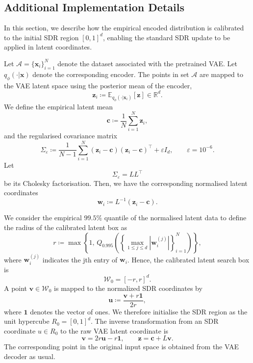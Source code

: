 \documentclass[pdflatex,sn-mathphys-num]{sn-jnl}%
\theoremstyle{thmstyleone}%
\theoremstyle{thmstyletwo}%
\theoremstyle{thmstylethree}%
\begin{document}
\begin{appendices}
\section{Additional Implementation Details}\label{Appendix: Additional Implementation Details}

In this section, we describe how the empirical encoded distribution is calibrated to the initial SDR region $[0, 1]^d$, enabling the standard SDR update to be applied in latent coordinates. 

Let $\mathcal{A}  =\{\mathbf{x}_i\}_{i=1}^{N}$ denote the dataset associated with the pretrained VAE. Let $q_\phi(\cdot|\mathbf{x})$ denote the corresponding encoder. The points in set $\mathcal{A}$ are mapped to the VAE latent space using the posterior mean of the encoder,
\[
\mathbf{z}_i
    \coloneq \mathbb E_{q_{\phi}(\cdot|\mathbf{x}_i)}[\mathbf{z}]
   \in\mathbb{R}^{d}.
\]
We define the empirical latent mean
\[
\mathbf{c}
   \coloneq \frac{1}{N}
    \sum_{i=1}^{N}\mathbf{z}_i,
\]
and the regularised covariance matrix
\[
\Sigma_{\varepsilon}
   \coloneq \frac{1}{N-1}
    \sum_{i=1}^{N}
    (\mathbf{z}_i-\mathbf{c})
    (\mathbf{z}_i-\mathbf{c})^{\top}
    +\varepsilon I_d,
    \qquad \varepsilon=10^{-6}.
\]
Let
\[
\Sigma_{\varepsilon}=LL^{\top}
\]
be its Cholesky factorisation. Then, we have the corresponding normalised latent coordinates
\[
\mathbf{w}_i
    \coloneq L^{-1}(\mathbf{z}_i-\mathbf{c}).
\]

We consider the empirical $99.5\%$ quantile of the normalised latent data to define the radius of the calibrated latent box as
\[
r
   \coloneq \max\left\{
      1,\,
      Q_{0.995}
      \left(
        \left\{
          \max_{1\leq j\leq d}
          |\mathbf{w}_{i}^{(j)}|
        \right\}_{i=1}^{N}
      \right)
    \right\},
\]
where $\mathbf{w}_{i}^{(j)}$ indicates the jth entry of $\mathbf{w}_i$. Hence, the calibrated latent search box is
\[
\mathcal{W}_0=[-r,r]^d.
\]
A point \(\mathbf{v}\in\mathcal{W}_0\) is mapped to the normalized SDR coordinates by
\[
\mathbf{u}
   \coloneq \frac{\mathbf{v}+r\mathbf{1}}{2r},
\]
where $\mathbf{1}$ denotes the vector of ones. We therefore initialise the SDR region as the unit hypercube $R_0=[0,1]^d$. The inverse transformation from an SDR coordinate \(u\in R_0\) to the raw VAE latent coordinate is
\begin{equation}\label{eq: normal latent to raw latent}
    \mathbf{v}=2r \mathbf{u} - r \mathbf{1}, \qquad \mathbf{z}=\mathbf{c}+L\mathbf{v}.
\end{equation}
The corresponding point in the original input space is obtained from the VAE decoder as usual.


\end{appendices}
\end{document}
